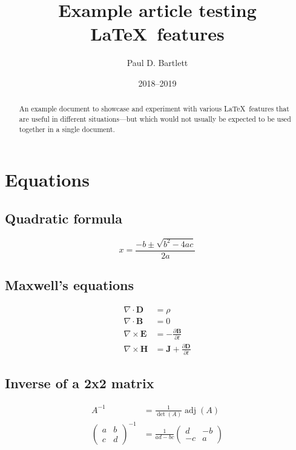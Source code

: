\documentclass[11pt,a4paper]{article}
\title{Example article testing \LaTeX\ features}
\author{Paul D. Bartlett}
\date{2018--2019}
\begin{document}
\maketitle

\begin{abstract}
An example document to showcase and experiment with various \LaTeX\ features that
are useful in different situations---but which would not usually be expected to be used
together in a single document.
\end{abstract}

\tableofcontents
\listoftables
\listoffigures

\section{Equations}

\subsection{Quadratic formula}
\begin{equation}
x = \frac{-b \pm \sqrt{b^2 - 4ac}}{2a}
\end{equation}

\subsection{Maxwell's equations}
\begin{align}
\nabla \cdot \mathbf{D} &= \rho\\
\nabla \cdot \mathbf{B} &= 0\\
\nabla \times \mathbf{E} &= -\frac{\partial \mathbf{B}} {\partial t}\\
\nabla \times \mathbf{H} &= \mathbf{J} + \frac{\partial \mathbf{D}} {\partial t}
\end{align}

\subsection{Inverse of a 2x2 matrix}
\begin{align}
A^{-1} &= \frac{1}{\det(A)} \operatorname{adj}(A)\\
\begin{pmatrix}
a & b\\
c & d
\end{pmatrix}^{-1}
&=
\frac{1}{ad-bc}
\begin{pmatrix}
d & -b\\
-c & a
\end{pmatrix}
\end{align}
\end{document}
